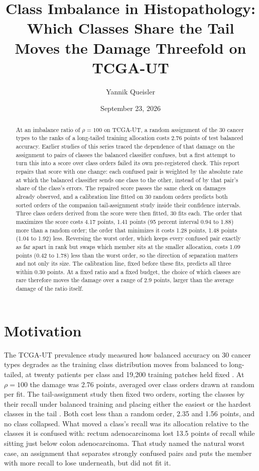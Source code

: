\documentclass[11pt]{article}
\title{Class Imbalance in Histopathology:\\Which Classes Share the Tail Moves the Damage Threefold on TCGA-UT}
\author{Yannik Queisler}
\date{September 23, 2026}
\begin{document}
\raggedbottom
{}
\setlength{\emergencystretch}{2em}
\maketitle
\begin{abstract}
\noindent At an imbalance ratio of $\rho=100$ on TCGA-UT, a random assignment of the 30 cancer types to the ranks of a long-tailed training allocation costs 2.76 points of test balanced accuracy. Earlier studies of this series traced the dependence of that damage on the assignment to pairs of classes the balanced classifier confuses, but a first attempt to turn this into a score over class orders failed its own pre-registered check. This report repairs that score with one change: each confused pair is weighted by the absolute rate at which the balanced classifier sends one class to the other, instead of by that pair's share of the class's errors. The repaired score passes the same check on damages already observed, and a calibration line fitted on 30 random orders predicts both sorted orders of the companion tail-assignment study inside their confidence intervals. Three class orders derived from the score were then fitted, 30 fits each. The order that maximizes the score costs 4.17 points, 1.41 points (95 percent interval 0.94 to 1.88) more than a random order; the order that minimizes it costs 1.28 points, 1.48 points (1.04 to 1.92) less. Reversing the worst order, which keeps every confused pair exactly as far apart in rank but swaps which member sits at the smaller allocation, costs 1.09 points (0.42 to 1.78) less than the worst order, so the direction of separation matters and not only its size. The calibration line, fixed before these fits, predicts all three within 0.30 points. At a fixed ratio and a fixed budget, the choice of which classes are rare therefore moves the damage over a range of 2.9 points, larger than the average damage of the ratio itself.
\end{abstract}

\section{Motivation}
\label{sec:motivation}
The TCGA-UT prevalence study measured how balanced accuracy on 30 cancer types degrades as the training class distribution moves from balanced to long-tailed, at twenty patients per class and 19,200 training patches held fixed \citep{queisler2026prevalenceTcga}. At $\rho=100$ the damage was 2.76 points, averaged over class orders drawn at random per fit. The tail-assignment study then fixed two orders, sorting the classes by their recall under balanced training and placing either the easiest or the hardest classes in the tail \citep{queisler2026tailTcga}. Both cost less than a random order, 2.35 and 1.56 points, and no class collapsed. What moved a class's recall was its allocation relative to the classes it is confused with: rectum adenocarcinoma lost 13.5 points of recall while sitting just below colon adenocarcinoma. That study named the natural worst case, an assignment that separates strongly confused pairs and puts the member with more recall to lose underneath, but did not fit it.
\end{document}
